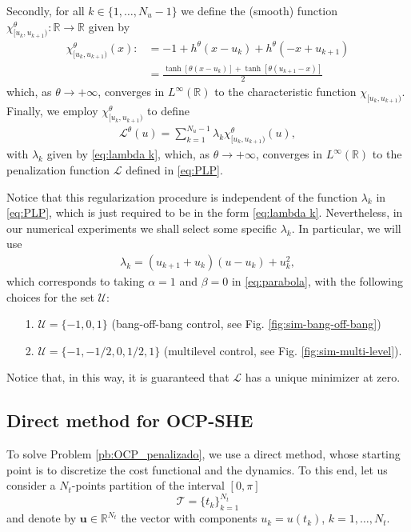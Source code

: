 \documentclass[9pt,shortpaper,twoside,web]{ieeecolor}
\begin{document}
Secondly, for all $k \in \{1,\dots,N_u-1\}$ we define the (smooth) function $\chi_{[u_k,u_{k+1})}^\theta:\mathbb{R} \rightarrow \mathbb{R}$ given by
\begin{align*}
	\chi_{[u_k,u_{k+1})}^\theta(x) :&= - 1 + h^\theta(x-u_k) + h^\theta(-x+u_{k+1}) 
	\\[5pt]
	&= \frac{\tanh[\theta(x-u_k)] + \tanh[\theta (u_{k+1}-x)]}{2}
\end{align*}
which, as $\theta\to +\infty$, converges in $L^\infty(\mathbb{R})$ to the characteristic function $\chi_{[u_k,u_{k+1})}$. Finally, we employ $\chi_{[u_k,u_{k+1})}^\theta$ to define
\begin{align}\label{eq:Lsmooth}
	\mathcal{L}^\theta(u) = \sum_{k = 1}^{N_u-1} \lambda_k \chi^\theta_{[u_k,u_{k+1})}(u),
\end{align}
with $\lambda_k$ given by \eqref{eq:lambda k}, which, as $\theta\to +\infty$, converges in $L^\infty(\mathbb{R})$ to the penalization function $\mathcal L$ defined in \eqref{eq:PLP}.

Notice that this regularization procedure is independent of the function $\lambda_k$ in \eqref{eq:PLP}, which is just required to be in the form \eqref{eq:lambda k}. Nevertheless, in our numerical experiments we shall select some specific $\lambda_k$. In particular, we will use 
\begin{gather}
	\lambda_k = (u_{k+1}+u_{k}) (u-u_k) + u_k^2, 
\end{gather}
which corresponds to taking $\alpha=1$ and $\beta=0$ in \eqref{eq:parabola}, with the following choices for the set $\mathcal U$:
\begin{itemize}
	\item[1.] $\mathcal U=\{-1,0,1\}$ (bang-off-bang control, see Fig. \ref{fig:sim-bang-off-bang})
	\item[2.] $\mathcal U=\{-1,-1/2,0,1/2,1\}$ (multilevel control, see Fig. \ref{fig:sim-multi-level}).
\end{itemize}

Notice that, in this way, it is guaranteed that $\mathcal L$ has a unique minimizer at zero.

\subsection{Direct method  for OCP-SHE}

To solve Problem \ref{pb:OCP_penalizado}, we use a direct method, whose starting point is to discretize the cost functional and the dynamics. To this end, let us consider a $N_t$-points partition of the interval $[0,\pi]$ 
\begin{displaymath} 
	\mathcal{T} = \{t_k\}_{k=1}^{N_t} 
\end{displaymath}
and denote by $\bm{u} \in \mathbb{R}^{N_t}$ the vector with components $u_k = u(t_k)$, $k=1,\ldots,N_t$.
\end{document}
